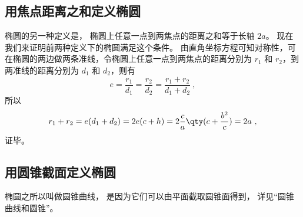 \subsection{用焦点距离之和定义椭圆}
椭圆的另一种定义是， 椭圆上任意一点到两焦点的距离之和等于长轴 $2a$。 现在我们来证明前两种定义下的椭圆满足这个条件。 由直角坐标方程可知对称性，可在椭圆的两边做两条准线，令椭圆上任意一点到两焦点的距离分别为 $r_1$ 和 $r_2$，到两准线的距离分别为 $d_1$ 和 $d_2$，则有
\begin{equation}
e = \frac{r_1}{d_1} = \frac{r_2}{d_2} = \frac{r_1 + r_2}{d_1 + d_2}~,
\end{equation}
所以
\begin{equation}\label{eq_Elips3_9}
r_1 + r_2 = e(d_1+d_2) = 2e(c + h) = 2\frac{c}{a} \qty( c + \frac{b^2}{c} ) = 2a~,
\end{equation}
证毕。

\subsection{用圆锥截面定义椭圆}
椭圆之所以叫做圆锥曲线， 是因为它们可以由平面截取圆锥面得到， 详见“圆锥曲线和圆锥”。
